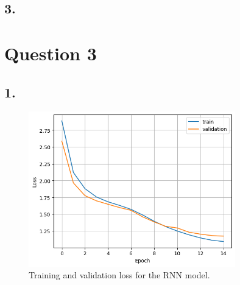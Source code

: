 \documentclass[11pt]{article}
\begin{document}
\subsection{3.}
\section{Question 3}
\subsection{1.}
\begin{figure}[H]
    \centering
    \includegraphics[width=0.8\textwidth]{./plots/recurrent_loss_per_epoch}
    \caption{Training and validation loss for the RNN model.}
    \label{fig:recurrent_loss_per_epoch}
\end{figure}
\end{document}
